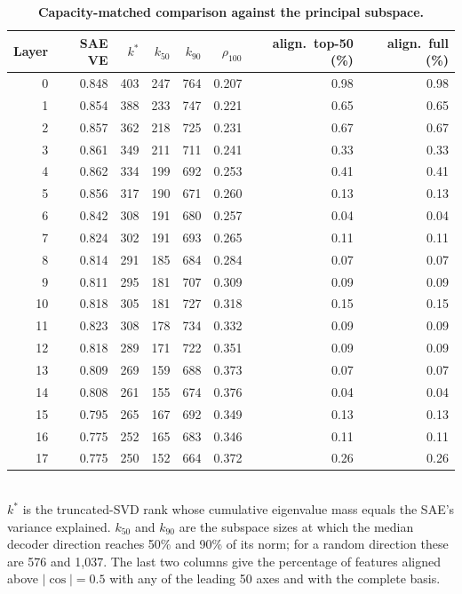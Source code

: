 \documentclass[11pt]{article}
\begin{document}
\begin{table}[htbp]
\centering
\caption{\textbf{Capacity-matched comparison against the principal subspace.}}
\label{tab:svd_capacity}
\smallskip
\small
\begin{tabular}{rrrrrrrr}
\toprule
Layer & SAE VE & $k^{*}$ & $k_{50}$ & $k_{90}$ & $\rho_{100}$ & align.\ top-50 (\%) & align.\ full (\%) \\
\midrule
0 & 0.848 & 403 & 247 & 764 & 0.207 & 0.98 & 0.98 \\
1 & 0.854 & 388 & 233 & 747 & 0.221 & 0.65 & 0.65 \\
2 & 0.857 & 362 & 218 & 725 & 0.231 & 0.67 & 0.67 \\
3 & 0.861 & 349 & 211 & 711 & 0.241 & 0.33 & 0.33 \\
4 & 0.862 & 334 & 199 & 692 & 0.253 & 0.41 & 0.41 \\
5 & 0.856 & 317 & 190 & 671 & 0.260 & 0.13 & 0.13 \\
6 & 0.842 & 308 & 191 & 680 & 0.257 & 0.04 & 0.04 \\
7 & 0.824 & 302 & 191 & 693 & 0.265 & 0.11 & 0.11 \\
8 & 0.814 & 291 & 185 & 684 & 0.284 & 0.07 & 0.07 \\
9 & 0.811 & 295 & 181 & 707 & 0.309 & 0.09 & 0.09 \\
10 & 0.818 & 305 & 181 & 727 & 0.318 & 0.15 & 0.15 \\
11 & 0.823 & 308 & 178 & 734 & 0.332 & 0.09 & 0.09 \\
12 & 0.818 & 289 & 171 & 722 & 0.351 & 0.09 & 0.09 \\
13 & 0.809 & 269 & 159 & 688 & 0.373 & 0.07 & 0.07 \\
14 & 0.808 & 261 & 155 & 674 & 0.376 & 0.04 & 0.04 \\
15 & 0.795 & 265 & 167 & 692 & 0.349 & 0.13 & 0.13 \\
16 & 0.775 & 252 & 165 & 683 & 0.346 & 0.11 & 0.11 \\
17 & 0.775 & 250 & 152 & 664 & 0.372 & 0.26 & 0.26 \\
\bottomrule
\end{tabular}
\\[2pt]
\footnotesize $k^{*}$ is the truncated-SVD rank whose cumulative eigenvalue mass equals the SAE's variance explained. $k_{50}$ and $k_{90}$ are the subspace sizes at which the median decoder direction reaches 50\% and 90\% of its norm; for a random direction these are 576 and 1{,}037. The last two columns give the percentage of features aligned above $|\cos| = 0.5$ with any of the leading 50 axes and with the complete basis.
\end{table}
\end{document}
